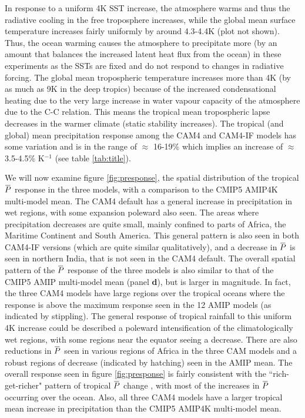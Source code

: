 \documentclass[letterpaper,12pt,titlepage,oneside,final]{book}
\newcommand{\overbar}[1]{\mkern 1.5mu\overline{\mkern-1.5mu#1\mkern-1.5mu}\mkern 1.5mu}
\begin{document}
In response to a uniform 4K SST increase, the atmosphere warms and thus the radiative cooling in the free troposphere increases, while the global mean surface temperature increases fairly uniformly by around 4.3-4.4K (plot not shown). Thus, the ocean warming causes the atmosphere to precipitate more (by an amount that balances the increased latent heat flux from the ocean) in these experiments as the SSTs are fixed and do not respond to changes in radiative forcing. The global mean tropospheric temperature increases more than 4K (by as much as 9K in the deep tropics) because of the increased condensational heating due to the very large increase in water vapour capacity of the atmosphere due to the C-C relation. This means the tropical mean tropospheric lapse decreases in the warmer climate (static stability increases). The tropical (and global) mean precipitation response among the CAM4 and CAM4-IF models has some variation and is in the range of $\approx$ 16-19\% which implies an increase of $\approx$ 3.5-4.5\% K$^{-1}$ (see table \ref{tab:title}).

We will now examine figure \ref{fig:presponse}, the spatial distribution of the tropical $\overbar{P}$ response in the three models, with a comparison to the CMIP5 AMIP4K multi-model mean. The CAM4 default has a general increase in precipitation in wet regions, with some expansion poleward also seen. The areas where precipitation decreases are quite small, mainly confined to parts of Africa, the Maritime Continent and South America. This general pattern is also seen in both CAM4-IF versions (which are quite similar qualitatively), and a decrease in $\overbar{P}$ is seen in northern India, that is not seen in the CAM4 default. The overall spatial pattern of the $\overbar{P}$ response of the three models is also similar to that of the CMIP5 AMIP multi-model mean (panel \textbf{d}), but is larger in magnitude. In fact, the three CAM4 models have large regions over the tropical oceans where the response is above the maximum response seen in the 12 AMIP models (as indicated by stippling). The general response of tropical rainfall to this uniform 4K increase could be described a poleward intensification of the climatologically wet regions, with some regions near the equator seeing a decrease. There are also reductions in $\overbar{P}$ seen in various regions of Africa in the three CAM models and a robust regions of decrease (indicated by hatching) seen in the AMIP mean. The overall response seen in figure \ref{fig:presponse} is fairly consistent with the ``rich-get-richer" pattern of tropical $\overbar{P}$ change \citep{held_robust_2006,chou_evaluating_2009}, with most of the increases in $\overbar{P}$ occurring over the ocean. Also, all three CAM4 models have a larger tropical mean increase in precipitation than the CMIP5 AMIP4K multi-model mean.
\end{document}
